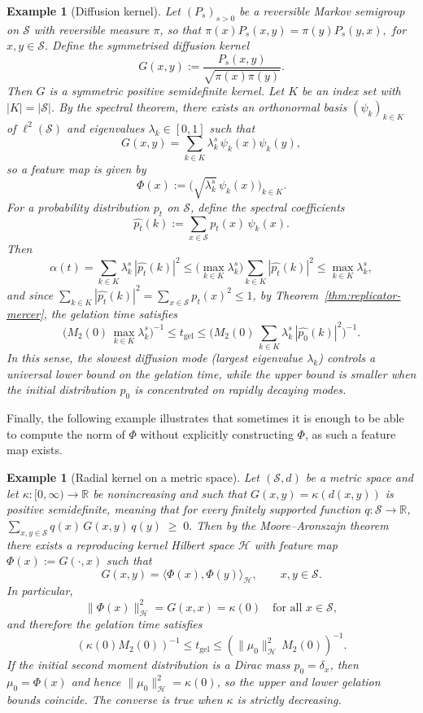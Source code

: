\documentclass[12pt,twoside]{article}
\newtheorem{example}[thm]{Example}
\begin{document}
\begin{example}[Diffusion kernel]\label{ex:semigroup-mercer}
Let $(P_s)_{s>0}$ be a reversible Markov semigroup on $\mathcal S$ with
reversible measure $\pi$, so that $\pi(x)P_s(x,y)=\pi(y)P_s(y,x),$ for $ x,y\in\mathcal S.$
Define the symmetrised diffusion kernel
\[
G(x,y):=\frac{P_s(x,y)}{\sqrt{\pi(x)\pi(y)}}.
\]
Then $G$ is a symmetric positive semidefinite kernel. Let $K$ be an index set
with $|K|=|\mathcal S|$. By the spectral theorem, there exists an orthonormal basis $(\psi_k)_{k\in K}$ of $\ell^2(\mathcal S)$ and eigenvalues $\lambda_k\in[0,1]$ such that
\[
G(x,y)=\sum_{k\in K} \lambda_k^s\,\psi_k(x)\psi_k(y),
\]
so a feature map is given by
\[
\Phi(x):=\bigl(\sqrt{\lambda_k^s}\,\psi_k(x)\bigr)_{k\in K}.
\]
For a probability distribution $p_t$ on $\mathcal S$, define the spectral
coefficients
\[
\widehat{p_t}(k):=\sum_{x\in\mathcal S} p_t(x)\,\psi_k(x).
\]
Then
\[
\alpha(t)
=
\sum_{k\in K} \lambda_k^s\,|\widehat{p_t}(k)|^2
\le
\bigl(\max_{k\in K}\lambda_k^s\bigr)
\sum_{k\in K} |\widehat{p_t}(k)|^2
\le
\max_{k\in K}\lambda_k^s,
\]
and since $\sum_{k\in K}|\widehat{p_t}(k)|^2=\sum_{x\in\mathcal S}p_t(x)^2\le1$,
by Theorem~\ref{thm:replicator-mercer}, the gelation time satisfies
\[
\bigl(M_2(0)\,\max_{k\in K}\lambda_k^s\bigr)^{-1}
\le t_{\mathrm{gel}}\le
\biggl(
M_2(0)\,\sum_{k\in K}\lambda_k^s\,|\widehat{p_0}(k)|^2
\biggr)^{-1}.
\]
In this sense, the slowest diffusion mode (largest eigenvalue $\lambda_k$)
controls a universal lower bound on the gelation time, while the upper bound
is smaller when the initial distribution $p_0$ is concentrated on rapidly
decaying modes.
\end{example}


Finally, the following example illustrates that sometimes it is enough to be able to compute the norm of $\Phi$ without explicitly constructing $\Phi$, as such a feature map exists.
\begin{example}[Radial kernel on a metric space]\label{ex:radial-mercer}
Let $(\mathcal S,d)$ be a metric space and let $\kappa:[0,\infty)\to\mathbb R$ be nonincreasing and
such that $G(x,y)=\kappa(d(x,y))$ is \emph{positive semidefinite}, meaning that for every finitely supported
function $q:\mathcal S\to\mathbb R$, $\sum_{x,y\in\mathcal S} q(x)\,G(x,y)\,q(y)\;\ge\;0.$
Then by the Moore--Aronszajn theorem \cite{Aronszajn1950} there exists a reproducing kernel Hilbert space $\mathcal H$
with feature map $\Phi(x):=G(\cdot,x)$ such that
\[
G(x,y)=\langle \Phi(x),\Phi(y)\rangle_{\mathcal H}, \qquad x,y\in\mathcal S.
\]
In particular,
\[
\|\Phi(x)\|_{\mathcal H}^2 = G(x,x) = \kappa(0)
\quad\text{for all }x\in\mathcal S,
\]
and therefore the gelation time satisfies
\[
(\kappa(0)M_2(0))^{-1}
\le
t_{\mathrm{gel}}
\le
(\|\mu_0\|_{\mathcal H}^2\,M_2(0))^{-1}.
\]
If the initial second moment distribution is a Dirac mass $p_0=\delta_x$, then
$\mu_0=\Phi(x)$ and hence $\|\mu_0\|_{\mathcal H}^2=\kappa(0)$, so the upper and lower
gelation bounds coincide. The converse is true when $\kappa$ is strictly decreasing.
\end{example}
\end{document}
